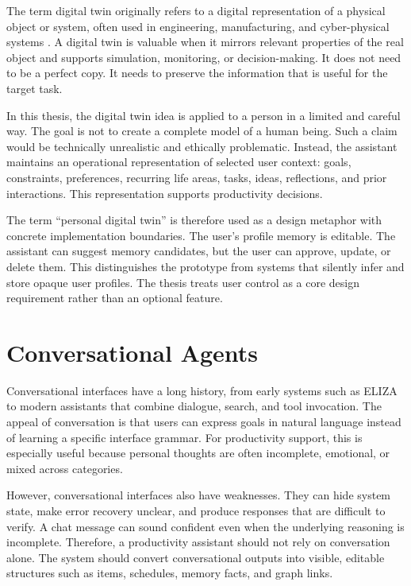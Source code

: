 The term digital twin originally refers to a digital representation of a physical object or system, often used in engineering, manufacturing, and cyber-physical systems \cite{grieves2017digital,schroeder2016digital}. A digital twin is valuable when it mirrors relevant properties of the real object and supports simulation, monitoring, or decision-making. It does not need to be a perfect copy. It needs to preserve the information that is useful for the target task.

In this thesis, the digital twin idea is applied to a person in a limited and careful way. The goal is not to create a complete model of a human being. Such a claim would be technically unrealistic and ethically problematic. Instead, the assistant maintains an operational representation of selected user context: goals, constraints, preferences, recurring life areas, tasks, ideas, reflections, and prior interactions. This representation supports productivity decisions.

The term ``personal digital twin'' is therefore used as a design metaphor with concrete implementation boundaries. The user's profile memory is editable. The assistant can suggest memory candidates, but the user can approve, update, or delete them. This distinguishes the prototype from systems that silently infer and store opaque user profiles. The thesis treats user control as a core design requirement rather than an optional feature.

\section{Conversational Agents}

Conversational interfaces have a long history, from early systems such as ELIZA \cite{weizenbaum1966eliza} to modern assistants that combine dialogue, search, and tool invocation. The appeal of conversation is that users can express goals in natural language instead of learning a specific interface grammar. For productivity support, this is especially useful because personal thoughts are often incomplete, emotional, or mixed across categories.

However, conversational interfaces also have weaknesses. They can hide system state, make error recovery unclear, and produce responses that are difficult to verify. A chat message can sound confident even when the underlying reasoning is incomplete. Therefore, a productivity assistant should not rely on conversation alone. The system should convert conversational outputs into visible, editable structures such as items, schedules, memory facts, and graph links.

